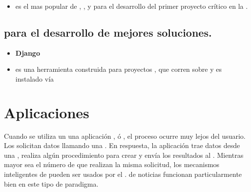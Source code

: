 \begin{itemize}
	\item \textbf{\bootstrap} es el \framework mas popular de \htmlNAME, \cssNAME, y \javaScriptNAME para el desarrollo del primer proyecto \mobile crítico en la \web \cite{technology_bootstrap}.
\end{itemize}

\subsection{\tools para el desarrollo de mejores soluciones.}
\begin{itemize}
	\item \textbf{Django}
	\item \textbf{\grunttool} es una herramienta \commandLine \taskBased construida para proyectos \javaScriptNAME, que corren sobre \nodejsNAME y es instalado vía \npm \cite{technology_gruntjs}
\end{itemize}


\section{Aplicaciones \web}

Cuando se utiliza un \backend \running una aplicación \javaNAME, \phpNAME ó \rails, el proceso ocurre muy lejos del usuario. Los \clientsAS solicitan datos llamando una \uri. En respuesta, la aplicación trae datos desde una \dataBase, realiza algún procedimiento para crear \htmlNAME y envía los resultados al \clientAS. Mientras mayor sea el número de \clientsAS que realizan la misma solicitud, los mecanismos inteligentes de \caching pueden ser usados por el \serverAS. \sites de noticias funcionan particularmente bien en este tipo de paradigma.

